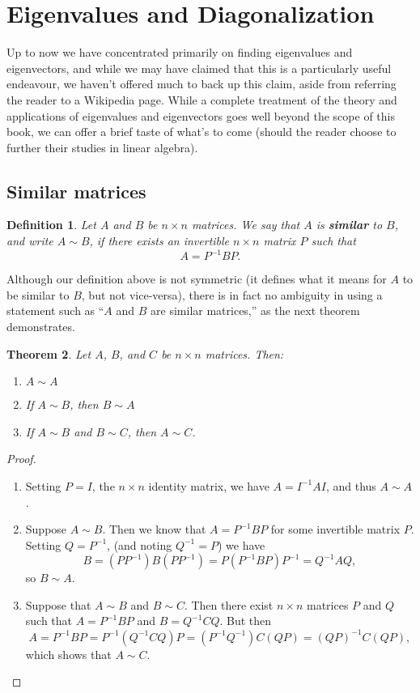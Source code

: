 \documentclass[12pt,letterpaper]{article}
\author{Sean Fitzpatrick}
\newtheorem{theorem}{Theorem}
\newtheorem{definition}[theorem]{Definition}
\begin{document}
\section{Eigenvalues and Diagonalization} 
Up to now we have concentrated primarily on finding eigenvalues and eigenvectors, and while we may have claimed that this is a particularly useful endeavour, we haven't offered much to back up this claim, aside from referring the reader to a Wikipedia page. While a complete treatment of the theory and applications of eigenvalues and eigenvectors goes well beyond the scope of this book, we can offer a brief taste of what's to come (should the reader choose to further their studies in linear algebra).

\subsection{Similar matrices}
\begin{definition}
 Let $A$ and $B$ be $n\times n$ matrices. We say that $A$ is \textbf{similar} to $B$, and write $A\sim B$, if there exists an invertible $n\times n$ matrix $P$ such that
\[
 A = P^{-1}BP.
\]
\end{definition}

Although our definition above is not symmetric (it defines what it means for $A$ to be similar to $B$, but not vice-versa), there is in fact no ambiguity in using a statement such as ``$A$ and $B$ are similar matrices,'' as the next theorem demonstrates.

\begin{theorem}
 Let $A$, $B$, and $C$ be $n\times n$ matrices. Then:
\begin{enumerate}
 \item $A\sim A$
 \item If $A\sim B$, then  $B\sim A$
 \item If $A\sim B$ and $B\sim C$, then $A\sim C$.
\end{enumerate}
\end{theorem}
\begin{proof}
 \begin{enumerate}
  \item Setting $P=I$, the $n\times n$ identity matrix, we have $A = I^{-1}AI$, and thus $A\sim A$.
  \item Suppose $A\sim B$. Then we know that $A = P^{-1}BP$ for some invertible matrix $P$. Setting $Q=P^{-1}$, (and noting $Q^{-1} = P$) we have
\[
 B = (PP^{-1})B(PP^{-1}) = P(P^{-1}BP)P^{-1} = Q^{-1}AQ,
\]
so $B\sim A$.
 \item Suppose that $A\sim B$ and $B\sim C$. Then there exist $n\times n$ matrices $P$ and $Q$ such that $A = P^{-1}BP$ and $B=Q^{-1}CQ$. But then
\[
 A = P^{-1}BP = P^{-1}(Q^{-1}CQ)P = (P^{-1}Q^{-1})C(QP) = (QP)^{-1}C(QP),
\]
which shows that $A\sim C$.
 \end{enumerate}

\end{proof}
\end{document}
